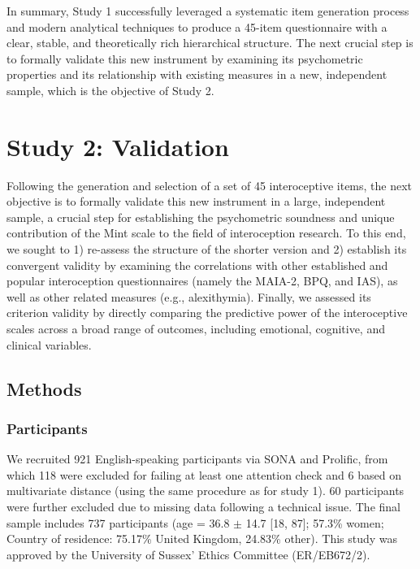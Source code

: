 \documentclass[
  jou,
  floatsintext,
  longtable,
  nolmodern,
  notxfonts,
  notimes,
  colorlinks=true,linkcolor=blue,citecolor=blue,urlcolor=blue]{apa7}
\begin{document}
In summary, Study 1 successfully leveraged a systematic item generation
process and modern analytical techniques to produce a 45-item
questionnaire with a clear, stable, and theoretically rich hierarchical
structure. The next crucial step is to formally validate this new
instrument by examining its psychometric properties and its relationship
with existing measures in a new, independent sample, which is the
objective of Study 2.

\section{Study 2: Validation}\label{study-2-validation}

Following the generation and selection of a set of 45 interoceptive
items, the next objective is to formally validate this new instrument in
a large, independent sample, a crucial step for establishing the
psychometric soundness and unique contribution of the Mint scale to the
field of interoception research. To this end, we sought to 1) re-assess
the structure of the shorter version and 2) establish its convergent
validity by examining the correlations with other established and
popular interoception questionnaires (namely the MAIA-2, BPQ, and IAS),
as well as other related measures (e.g., alexithymia). Finally, we
assessed its criterion validity by directly comparing the predictive
power of the interoceptive scales across a broad range of outcomes,
including emotional, cognitive, and clinical variables.

\subsection{Methods}\label{methods-1}

\subsubsection{Participants}\label{participants-1}

We recruited 921 English-speaking participants via SONA and
Prolific\textcopyright, from which 118 were excluded for failing at
least one attention check and 6 based on multivariate distance (using
the same procedure as for study 1). 60 participants were further
excluded due to missing data following a technical issue. The final
sample includes 737 participants (age = 36.8 \(\pm\) 14.7 {[}18, 87{]};
57.3\% women; Country of residence: 75.17\% United Kingdom, 24.83\%
other). This study was approved by the University of Sussex' Ethics
Committee (ER/EB672/2).
\end{document}
